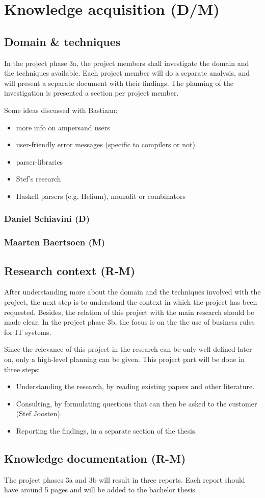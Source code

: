 
\section{Knowledge acquisition (D/M)}
\label{sec:knowledge-acquisition}

\subsection{Domain \& techniques}
In the project phase 3a, the project members shall investigate the domain and the techniques available.
Each project member will do a separate analysis, and will present a separate document with their findings.
The planning of the investigation is presented a section per project member.

Some ideas discussed with Bastiaan:
\begin{itemize}
  \item more info on ampersand users
  \item user-friendly error messages (specific to compilers or not)
  \item parser-libraries
  \item Stef's research
  \item Haskell parsers (e.g. Helium), monadit or combinators
\end{itemize}

\subsubsection{Daniel Schiavini (D)}
\lipsum[1]

\subsubsection{Maarten Baertsoen (M)}
\lipsum[1]

\subsection{Research context (R-M)}
After understanding more about the domain and the techniques involved with the project, the next step is to understand the context in which the project has been requested.
Besides, the relation of this project with the main research should be made clear.
In the project phase 3b, the focus is on the the use of business rules for IT systems.

Since the relevance of this project in the research can be only well defined later on, only a high-level planning can be given.
This project part will be done in three steps:
\begin{itemize}
	\item Understanding the research, by reading existing papers and other literature.
	\item Consulting, by formulating questions that can then be asked to the customer (Stef Joosten).
	\item Reporting the findings, in a separate section of the thesis.
\end{itemize}

\subsection{Knowledge documentation (R-M)}
The project phases 3a and 3b will result in three reports.
Each report should have around 5 pages and will be added to the bachelor thesis.

